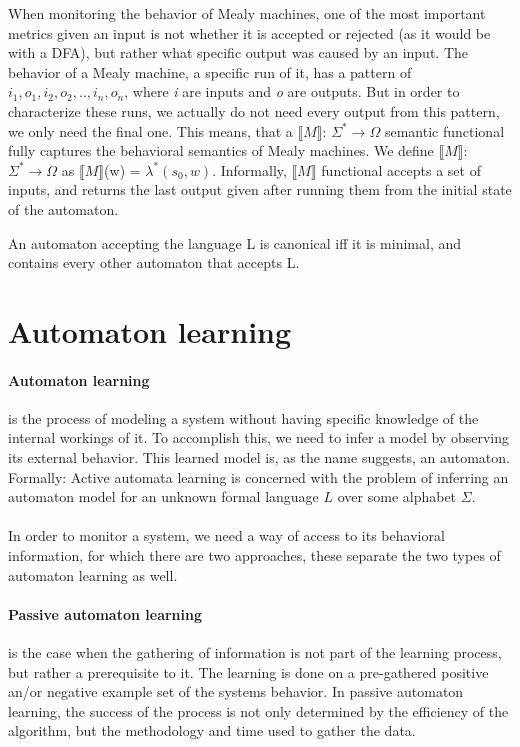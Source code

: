 When monitoring the behavior of Mealy machines, one of the most important metrics given an input is not whether it is accepted or rejected (as it would be with a DFA), but rather what specific output was caused by an input. The behavior of a Mealy machine, a specific run of it, has a pattern of \textit{$i_1,o_1,i_2,o_2,..,i_n,o_n$}, where \textit{i} are inputs and \textit{o} are outputs. But in order to characterize these runs, we actually do not need every output from this pattern, we only need the final one. This means, that a $\llbracket M\rrbracket$: $\Sigma^*\to\Omega$ semantic functional fully captures the behavioral semantics of Mealy machines. We define $\llbracket M\rrbracket$: $\Sigma^*\to\Omega$ as  $\llbracket M\rrbracket$(w) = $\lambda^*(s_0, w)$. Informally,  $\llbracket M\rrbracket$ functional accepts a set of inputs, and returns the last output given after running them from the initial state of the automaton.



\begin{definition}
	An automaton accepting the language L is canonical iff it is minimal, and contains every other automaton that accepts L.
\end{definition}

\section{Automaton learning}



\paragraph{Automaton learning}  is the process of modeling a system without having specific knowledge of the internal workings of it. To accomplish this, we need to infer a model by observing its external behavior. This learned model is, as the name suggests, an automaton. 
\\Formally: Active  automata  learning is  concerned  with  the  problem  of  inferring  an automaton model for an unknown formal language $L$ over some alphabet $\Sigma$\cite{Howar2018}.
\\\\In order to monitor a system, we need a way of access to its behavioral information, for which there are two approaches, these separate the two types of automaton learning as well.

\paragraph{Passive automaton learning} is the case when the gathering of information is not part of the learning process, but rather a prerequisite to it. The learning is done on a pre-gathered positive an/or negative example set of the systems behavior. In passive automaton learning, the success of the process is not only determined by the efficiency of the algorithm, but the methodology and time used to gather the data.

